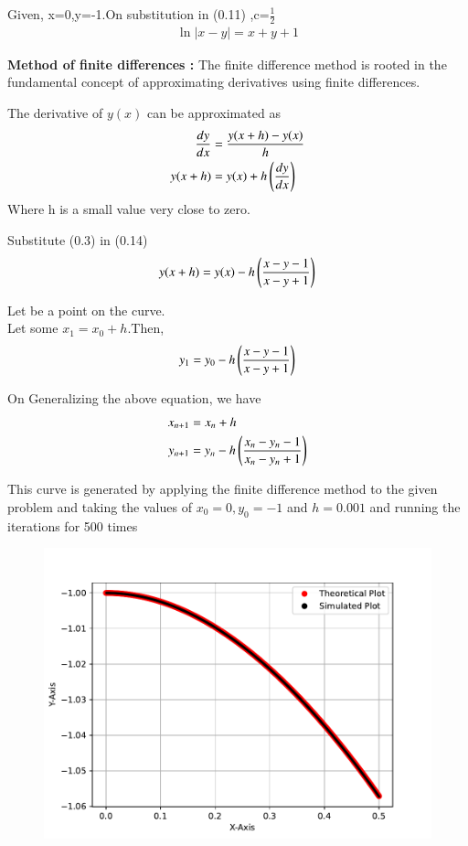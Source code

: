 \documentclass[journal]{IEEEtran}
\begin{document}
Given, x=0,y=-1.On substitution in (0.11) ,c=$\frac{1}{2}$
\begin{align}
    \ln{|x-y|}=x+y+1
\end{align}

\textbf{Method of finite differences :}
The finite difference method is rooted in the fundamental concept of approximating derivatives using finite differences.

The derivative of $y(x)$ can be approximated as 
\begin{align}
    \frac{dy}{dx}&=\frac{y(x+h)-y(x)}{h}\\
    y(x+h)&=y(x)+h\left(\frac{dy}{dx}\right)
\end{align}
Where h is a small value very close to zero.

Substitute (0.3) in (0.14)
\begin{align}
    y(x+h)=y(x)-h \left(\frac{x-y-1}{x-y+1}\right)
\end{align}

Let  be a point on the curve.\\
Let some $x_1=x_0 +h$.Then,
\begin{align}
    y_1 = y_0-h \left(\frac{x-y-1}{x-y+1}\right)
\end{align}

On Generalizing the above equation, we have 
\begin{align}
    x_{n+1}&=x_{n} +h \\
    y_{n+1}&=y_{n}-h \left(\frac{{x_n}-{y_n}-1}{{x_n}-{y_n}+1}\right) 
\end{align}

This curve is generated by applying the finite difference method to the given problem and taking the values of $x_0=0,y_0=-1$ and $h=0.001$ and running the iterations for 500 times 
\begin{figure}[h]
   \centering
   \includegraphics[width=\columnwidth]{figs/fig.pdf}
\end{figure}
\end{document}
